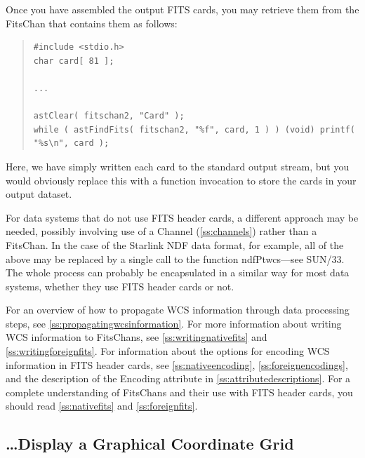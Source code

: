 \documentclass[twoside,11pt]{article}
\newcommand{\htmlref}[2]{#1}
\newcommand{\xref}[3]{#1}
\newcommand{\appref}[1]{Appendix~\ref{#1}}
\newcommand{\secref}[1]{\S\ref{#1}}
\renewcommand{\appref}[1]{\ref{#1}}
\renewcommand{\secref}[1]{\ref{#1}}
\begin{document}
Once you have assembled the output FITS cards, you may retrieve them
from the FitsChan that contains them as follows:

\begin{quote}
\small
\begin{verbatim}
#include <stdio.h>
char card[ 81 ];

...

astClear( fitschan2, "Card" );
while ( astFindFits( fitschan2, "%f", card, 1 ) ) (void) printf( "%s\n", card );
\end{verbatim}
\normalsize
\end{quote}

Here, we have simply written each card to the standard output stream,
but you would obviously replace this with a function invocation to
store the cards in your output dataset.

For data systems that do not use FITS header cards, a different
approach may be needed, possibly involving use of a \htmlref{Channel}{Channel}
(\secref{ss:channels}) rather than a FitsChan.  In the case of the
Starlink NDF data format, for example, all of the above may be
replaced by a single call to the function
\xref{ndfPtwcs}{sun33}{ndfPtwcs}---see \xref{SUN/33}{sun33}{}. The
whole process can probably be encapsulated in a similar way for most
data systems, whether they use FITS header cards or not.

For an overview of how to propagate WCS information through data
processing steps, see \secref{ss:propagatingwcsinformation}.  For more
information about writing WCS information to FitsChans, see
\secref{ss:writingnativefits} and \secref{ss:writingforeignfits}.  For
information about the options for encoding WCS information in FITS
header cards, see \secref{ss:nativeencoding},
\secref{ss:foreignencodings}, and the description of the Encoding
attribute in \appref{ss:attributedescriptions}.  For a complete
understanding of FitsChans and their use with FITS header cards, you
should read \secref{ss:nativefits} and \secref{ss:foreignfits}.

\subsection{\label{ss:howtoplotgrid}\ldots Display a Graphical Coordinate Grid}
\end{document}
